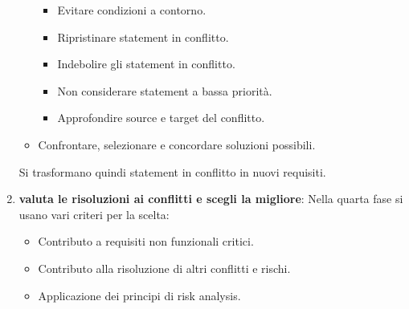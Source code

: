 \begin{enumerate}
\begin{itemize}
                        \begin{itemize}
                              \item Evitare condizioni a contorno.
                              \item Ripristinare statement in conflitto.
                              \item Indebolire gli statement in conflitto.
                              \item Non considerare statement a bassa priorità.
                              \item Approfondire source e target del conflitto.
                        \end{itemize}
                  \item Confrontare, selezionare e concordare soluzioni possibili.
            \end{itemize}
            Si trasformano quindi statement in conflitto in nuovi requisiti.
      \item \textbf{valuta le risoluzioni ai conflitti e scegli la migliore}: 
            Nella quarta fase si usano vari criteri per la scelta:
            \begin{itemize}
                  \item Contributo a requisiti non funzionali critici.
                  \item Contributo alla risoluzione di altri conflitti e rischi.
                  \item Applicazione dei principi di risk analysis.
            \end{itemize}
\end{enumerate}

